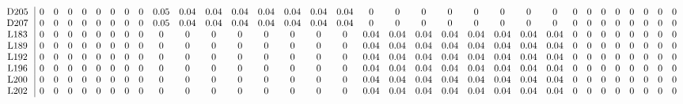 \begin{table}[H]
\begin{center}
\begin{math}
\begin{array}{c|cccccccccccccccccccccccccccccccc}
\mathrm{D205} \hspace*{2pt} &  0 &  0 &  0 &  0 &  0 &  0 &  0 &  0 &       0.05 &       0.04 &       0.04 &       0.04 &       0.04 &       0.04 &       0.04 &       0.04 &  0 &  0 &  0 &  0 &  0 &  0 &  0 &  0 &  0 &  0 &  0 &  0 &  0 &  0 &  0 &  0 \\
\mathrm{D207} \hspace*{2pt} &  0 &  0 &  0 &  0 &  0 &  0 &  0 &  0 &       0.05 &       0.04 &       0.04 &       0.04 &       0.04 &       0.04 &       0.04 &       0.04 &  0 &  0 &  0 &  0 &  0 &  0 &  0 &  0 &  0 &  0 &  0 &  0 &  0 &  0 &  0 &  0 \\
\mathrm{L183} \hspace*{2pt} &  0 &  0 &  0 &  0 &  0 &  0 &  0 &  0 &  0 &  0 &  0 &  0 &  0 &  0 &  0 &  0 &       0.04 &       0.04 &       0.04 &       0.04 &       0.04 &       0.04 &       0.04 &       0.04 &  0 &  0 &  0 &  0 &  0 &  0 &  0 &  0 \\
\mathrm{L189} \hspace*{2pt} &  0 &  0 &  0 &  0 &  0 &  0 &  0 &  0 &  0 &  0 &  0 &  0 &  0 &  0 &  0 &  0 &       0.04 &       0.04 &       0.04 &       0.04 &       0.04 &       0.04 &       0.04 &       0.04 &  0 &  0 &  0 &  0 &  0 &  0 &  0 &  0 \\
\mathrm{L192} \hspace*{2pt} &  0 &  0 &  0 &  0 &  0 &  0 &  0 &  0 &  0 &  0 &  0 &  0 &  0 &  0 &  0 &  0 &       0.04 &       0.04 &       0.04 &       0.04 &       0.04 &       0.04 &       0.04 &       0.04 &  0 &  0 &  0 &  0 &  0 &  0 &  0 &  0 \\
\mathrm{L196} \hspace*{2pt} &  0 &  0 &  0 &  0 &  0 &  0 &  0 &  0 &  0 &  0 &  0 &  0 &  0 &  0 &  0 &  0 &       0.04 &       0.04 &       0.04 &       0.04 &       0.04 &       0.04 &       0.04 &       0.04 &  0 &  0 &  0 &  0 &  0 &  0 &  0 &  0 \\
\mathrm{L200} \hspace*{2pt} &  0 &  0 &  0 &  0 &  0 &  0 &  0 &  0 &  0 &  0 &  0 &  0 &  0 &  0 &  0 &  0 &       0.04 &       0.04 &       0.04 &       0.04 &       0.04 &       0.04 &       0.04 &       0.04 &  0 &  0 &  0 &  0 &  0 &  0 &  0 &  0 \\
\mathrm{L202} \hspace*{2pt} &  0 &  0 &  0 &  0 &  0 &  0 &  0 &  0 &  0 &  0 &  0 &  0 &  0 &  0 &  0 &  0 &       0.04 &       0.04 &       0.04 &       0.04 &       0.04 &       0.04 &       0.04 &       0.04 &  0 &  0 &  0 &  0 &  0 &  0 &  0 &  0 \\

\end{array}
\end{math}
\end{center}
\end{table}
